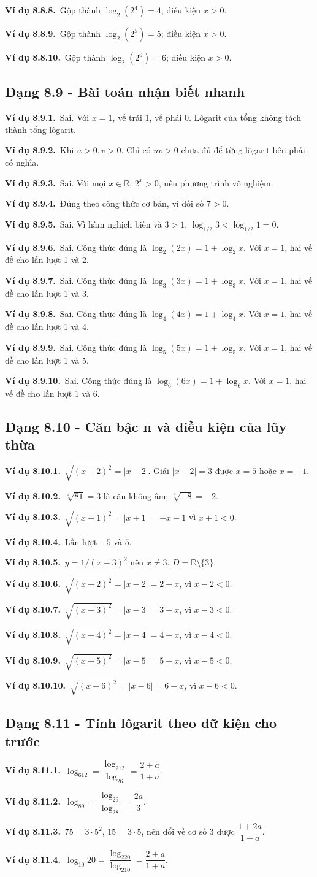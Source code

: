 \documentclass[11pt,a4paper]{article}
\newcommand{\vd}[1]{\par\Needspace{3\baselineskip}\textbf{\color{teal}Ví dụ #1.}\ }
\begin{document}
\vd{8.8.8}Gộp thành $\log_2(2^{4})=4$; điều kiện $x>0$.
\vd{8.8.9}Gộp thành $\log_2(2^{5})=5$; điều kiện $x>0$.
\vd{8.8.10}Gộp thành $\log_2(2^{6})=6$; điều kiện $x>0$.
\subsection{Dạng 8.9 - Bài toán nhận biết nhanh}
\vd{8.9.1}Sai. Với $x=1$, vế trái 1, vế phải 0. Lôgarit của tổng không tách thành tổng lôgarit.
\vd{8.9.2}Khi $u>0,v>0$. Chỉ có $uv>0$ chưa đủ để từng lôgarit bên phải có nghĩa.
\vd{8.9.3}Sai. Với mọi $x\in\mathbb R$, $2^x>0$, nên phương trình vô nghiệm.
\vd{8.9.4}Đúng theo công thức cơ bản, vì đối số $7>0$.
\vd{8.9.5}Sai. Vì hàm nghịch biến và $3>1$, $\log_{1/2}3<\log_{1/2}1=0$.
\vd{8.9.6}Sai. Công thức đúng là $\log_{2}(2x)=1+\log_{2}x$. Với $x=1$, hai vế đề cho lần lượt 1 và 2.
\vd{8.9.7}Sai. Công thức đúng là $\log_{3}(3x)=1+\log_{3}x$. Với $x=1$, hai vế đề cho lần lượt 1 và 3.
\vd{8.9.8}Sai. Công thức đúng là $\log_{4}(4x)=1+\log_{4}x$. Với $x=1$, hai vế đề cho lần lượt 1 và 4.
\vd{8.9.9}Sai. Công thức đúng là $\log_{5}(5x)=1+\log_{5}x$. Với $x=1$, hai vế đề cho lần lượt 1 và 5.
\vd{8.9.10}Sai. Công thức đúng là $\log_{6}(6x)=1+\log_{6}x$. Với $x=1$, hai vế đề cho lần lượt 1 và 6.
\subsection{Dạng 8.10 - Căn bậc n và điều kiện của lũy thừa}
\vd{8.10.1}$\sqrt{(x-2)^2}=|x-2|$. Giải $|x-2|=3$ được $x=5$ hoặc $x=-1$.
\vd{8.10.2}$\sqrt[4]{81}=3$ là căn không âm; $\sqrt[3]{-8}=-2$.
\vd{8.10.3}$\sqrt{(x+1)^2}=|x+1|=-x-1$ vì $x+1<0$.
\vd{8.10.4}Lần lượt $-5$ và $5$.
\vd{8.10.5}$y=1/(x-3)^2$ nên $x\ne3$. $D=\mathbb R\setminus\{3\}$.
\vd{8.10.6}$\sqrt{(x-2)^2}=|x-2|=2-x$, vì $x-2<0$.
\vd{8.10.7}$\sqrt{(x-3)^2}=|x-3|=3-x$, vì $x-3<0$.
\vd{8.10.8}$\sqrt{(x-4)^2}=|x-4|=4-x$, vì $x-4<0$.
\vd{8.10.9}$\sqrt{(x-5)^2}=|x-5|=5-x$, vì $x-5<0$.
\vd{8.10.10}$\sqrt{(x-6)^2}=|x-6|=6-x$, vì $x-6<0$.
\subsection{Dạng 8.11 - Tính lôgarit theo dữ kiện cho trước}
\vd{8.11.1}$\log_612=\dfrac{\log_212}{\log_26}=\dfrac{2+a}{1+a}$.
\vd{8.11.2}$\log_89=\dfrac{\log_29}{\log_28}=\dfrac{2a}{3}$.
\vd{8.11.3}$75=3\cdot5^2$, $15=3\cdot5$, nên đổi về cơ số 3 được $\dfrac{1+2a}{1+a}$.
\vd{8.11.4}$\log_{10}20=\dfrac{\log_220}{\log_210}=\dfrac{2+a}{1+a}$.
\end{document}
